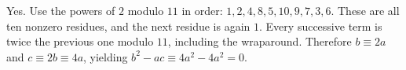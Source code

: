 Yes. Use the powers of $2$ modulo $11$ in order: $\boxed{1,2,4,8,5,10,9,7,3,6}$. These are all ten nonzero residues, and the next residue is again $1$. Every successive term is twice the previous one modulo $11$, including the wraparound. Therefore $b\equiv2a$ and $c\equiv2b\equiv4a$, yielding $b^2-ac\equiv4a^2-4a^2=0$.
